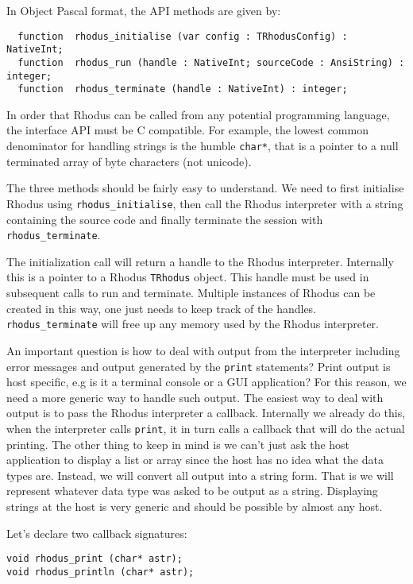 In Object Pascal format, the API methods are given by:

\begin{lstlisting}
  function  rhodus_initialise (var config : TRhodusConfig) : NativeInt;
  function  rhodus_run (handle : NativeInt; sourceCode : AnsiString) : integer;
  function  rhodus_terminate (handle : NativeInt) : integer;
\end{lstlisting}

In order that Rhodus can be called from any potential programming language, the interface API must be C compatible. For example, the lowest common denominator for handling strings is the humble {\tt char*}, that is a pointer to a null terminated array of byte characters (not unicode).

The three methods should be fairly easy to understand. We need to first initialise Rhodus using {\tt rhodus_initialise}, then call the Rhodus interpreter with a string containing the source code and finally terminate the session with {\tt rhodus_terminate}.

The initialization call will return a handle to the Rhodus interpreter. Internally this is a pointer to a Rhodus {\tt TRhodus} object. This handle must be used in subsequent calls to run and terminate. Multiple instances of Rhodus can be created in this way, one just needs to keep track of the handles. {\tt rhodus_terminate} will free up any memory used by the Rhodus interpreter.  

An important question is how to deal with output from the interpreter including error messages and output generated by the {\tt print} statements? Print output is host specific, e.g is it a terminal console or a GUI application? For this reason, we need a more generic way to handle such output. The easiest way to deal with output is to pass the Rhodus interpreter a callback. Internally we already do this, when the interpreter calls {\tt print}, it in turn calls a callback that will do the actual printing. The other thing to keep in mind is we can't just ask the host application to display a list or array since the host has no idea what the data types are. Instead, we will convert all output into a string form. That is we will represent whatever data type was asked to be output as a string. Displaying strings at the host is very generic and should be possible by almost any host.

Let's declare two callback signatures:

\begin{lstlisting}
void rhodus_print (char* astr);
void rhodus_println (char* astr);
\end{lstlisting}

